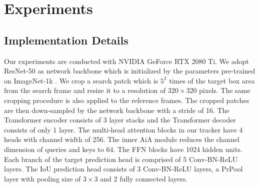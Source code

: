 \section{Experiments}

\subsection{Implementation Details}

Our experiments are conducted with NVIDIA GeForce RTX 2080 Ti. We adopt ResNet-50 \cite{he2016deep} as network backbone which is initialized by the parameters pre-trained on ImageNet-1k \cite{deng2009imagenet}. We crop a search patch which is $5 ^ {2}$ times of the target box area from the search frame and resize it to a resolution of $320 \times 320$ pixels. The same cropping procedure is also applied to the reference frames. The cropped patches are then down-sampled by the network backbone with a stride of 16. The Transformer encoder consists of 3 layer stacks and the Transformer decoder consists of only 1 layer. The multi-head attention blocks in our tracker have 4 heads with channel width of 256. The inner AiA module reduces the channel dimension of queries and keys to 64. The FFN blocks have 1024 hidden units. Each branch of the target prediction head is comprised of 5 Conv-BN-ReLU layers. The IoU prediction head consists of 3 Conv-BN-ReLU layers, a PrPool \cite{jiang2018acquisition} layer with pooling size of $3 \times 3$ and 2 fully connected layers.

